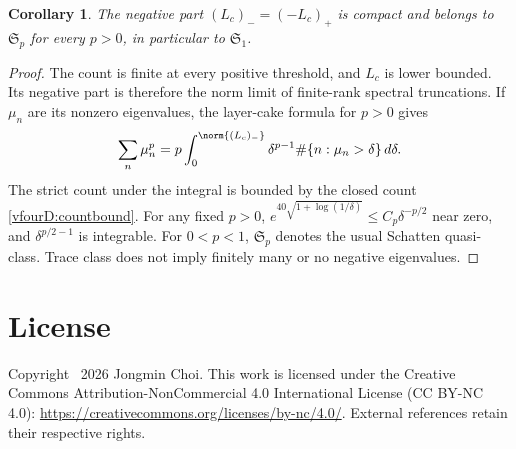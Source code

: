 \documentclass[11pt,a4paper]{article}
\numberwithin{equation}{section}
\newtheorem{corollary}[theorem]{Corollary}
\theoremstyle{definition}\newtheorem{definition}[theorem]{Definition}
\theoremstyle{remark}\newtheorem{remark}[theorem]{Remark}
\begin{document}
\begin{corollary}\label{vfourD:schatten}
The negative part $(L_c)_-=(-L_c)_+$ is compact and belongs to $\mathfrak S_p$ for every $p>0$, in particular to $\mathfrak S_1$.
\end{corollary}
\begin{proof}
The count is finite at every positive threshold, and $L_c$ is lower bounded. Its negative part is therefore the norm limit of finite-rank spectral truncations. If $\mu_n$ are its nonzero eigenvalues, the layer-cake formula for $p>0$ gives
\[\sum_n\mu_n^p=p\int_0^{\norm{(L_c)_-}}\delta^{p-1}\#\{n:\mu_n>\delta\}\,d\delta.
\]
The strict count under the integral is bounded by the closed count \eqref{vfourD:countbound}. For any fixed $p>0$, $e^{40\sqrt{1+\log(1/\delta)}}\le C_p\delta^{-p/2}$ near zero, and $\delta^{p/2-1}$ is integrable. For $0<p<1$, $\mathfrak S_p$ denotes the usual Schatten quasi-class. Trace class does not imply finitely many or no negative eigenvalues.
\end{proof}



\section*{License}
Copyright \textcopyright\ 2026 Jongmin Choi. This work is licensed under the Creative Commons Attribution-NonCommercial 4.0 International License (CC BY-NC 4.0): \url{https://creativecommons.org/licenses/by-nc/4.0/}. External references retain their respective rights.
\end{document}
